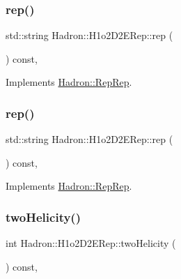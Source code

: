 \subsubsection{\texorpdfstring{rep()}{rep()}\hspace{0.1cm}{\footnotesize\ttfamily [2/3]}}
{\footnotesize\ttfamily std\+::string Hadron\+::\+H1o2\+D2\+E\+Rep\+::rep (\begin{DoxyParamCaption}{ }\end{DoxyParamCaption}) const\hspace{0.3cm}{\ttfamily [inline]}, {\ttfamily [virtual]}}



Implements \mbox{\hyperlink{structHadron_1_1RepRep_ab3213025f6de249f7095892109575fde}{Hadron\+::\+Rep\+Rep}}.

\mbox{\label{structHadron_1_1H1o2D2ERep_ac801e3e5c50b7740398e08b907cae155}} 
\subsubsection{\texorpdfstring{rep()}{rep()}\hspace{0.1cm}{\footnotesize\ttfamily [3/3]}}
{\footnotesize\ttfamily std\+::string Hadron\+::\+H1o2\+D2\+E\+Rep\+::rep (\begin{DoxyParamCaption}{ }\end{DoxyParamCaption}) const\hspace{0.3cm}{\ttfamily [inline]}, {\ttfamily [virtual]}}



Implements \mbox{\hyperlink{structHadron_1_1RepRep_ab3213025f6de249f7095892109575fde}{Hadron\+::\+Rep\+Rep}}.

\mbox{\label{structHadron_1_1H1o2D2ERep_a77a9c97dc4d7a120053dfb21794122ef}} 
\subsubsection{\texorpdfstring{twoHelicity()}{twoHelicity()}\hspace{0.1cm}{\footnotesize\ttfamily [1/2]}}
{\footnotesize\ttfamily int Hadron\+::\+H1o2\+D2\+E\+Rep\+::two\+Helicity (\begin{DoxyParamCaption}{ }\end{DoxyParamCaption}) const\hspace{0.3cm}{\ttfamily [inline]}, {\ttfamily [virtual]}}

